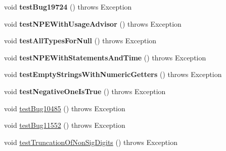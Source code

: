 \begin{DoxyCompactItemize}
\item 
\mbox{\label{classtestsuite_1_1regression_1_1_result_set_regression_test_a6e94637bdaa705a841b6250c5a1c74e3}} 
void {\bfseries test\+Bug19724} ()  throws Exception 
\item 
\mbox{\label{classtestsuite_1_1regression_1_1_result_set_regression_test_a9c88eb5f40272dcb6a8893c7974954b6}} 
void {\bfseries test\+N\+P\+E\+With\+Usage\+Advisor} ()  throws Exception 
\item 
\mbox{\label{classtestsuite_1_1regression_1_1_result_set_regression_test_ad2bea8a1f2ee52e4d670b2f5231f4658}} 
void {\bfseries test\+All\+Types\+For\+Null} ()  throws Exception 
\item 
\mbox{\label{classtestsuite_1_1regression_1_1_result_set_regression_test_a9704114e8c4af7e53ecb784c74630535}} 
void {\bfseries test\+N\+P\+E\+With\+Statements\+And\+Time} ()  throws Exception 
\item 
\mbox{\label{classtestsuite_1_1regression_1_1_result_set_regression_test_aa09d2e6b4a7cfb44ec027cacfd75c65e}} 
void {\bfseries test\+Empty\+Strings\+With\+Numeric\+Getters} ()  throws Exception 
\item 
\mbox{\label{classtestsuite_1_1regression_1_1_result_set_regression_test_a609ef66366b717dd75a53662fe01ad0d}} 
void {\bfseries test\+Negative\+One\+Is\+True} ()  throws Exception 
\item 
void \mbox{\hyperlink{classtestsuite_1_1regression_1_1_result_set_regression_test_a636970914398d594bf3bb15b35d2388e}{test\+Bug10485}} ()  throws Exception 
\item 
void \mbox{\hyperlink{classtestsuite_1_1regression_1_1_result_set_regression_test_a51f2936ac4b4712e95e6a70490704482}{test\+Bug11552}} ()  throws Exception 
\item 
void \mbox{\hyperlink{classtestsuite_1_1regression_1_1_result_set_regression_test_ab795cff973063bdb983542cffb1c54cd}{test\+Truncation\+Of\+Non\+Sig\+Digits}} ()  throws Exception 

\end{DoxyCompactItemize}
